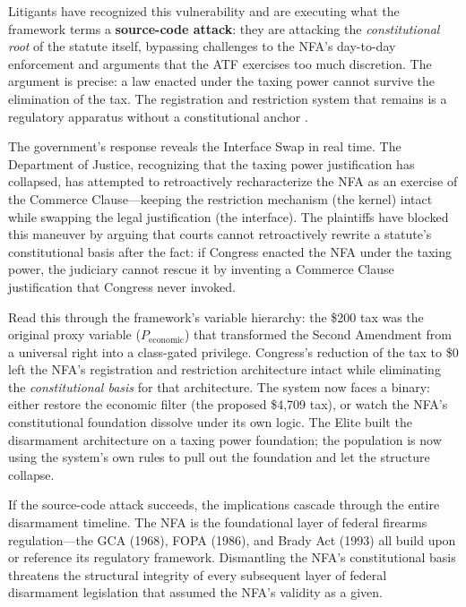 Litigants have recognized this vulnerability and are executing what the framework terms a \textbf{source-code attack}: they are attacking the \textit{constitutional root} of the statute itself, bypassing challenges to the NFA's day-to-day enforcement and arguments that the ATF exercises too much discretion. The argument is precise: a law enacted under the taxing power cannot survive the elimination of the tax. The registration and restriction system that remains is a regulatory apparatus without a constitutional anchor \cite{nfataxzero}.

The government's response reveals the Interface Swap in real time. The Department of Justice, recognizing that the taxing power justification has collapsed, has attempted to retroactively recharacterize the NFA as an exercise of the Commerce Clause---keeping the restriction mechanism (the kernel) intact while swapping the legal justification (the interface). The plaintiffs have blocked this maneuver by arguing that courts cannot retroactively rewrite a statute's constitutional basis after the fact: if Congress enacted the NFA under the taxing power, the judiciary cannot rescue it by inventing a Commerce Clause justification that Congress never invoked.

Read this through the framework's variable hierarchy: the \$200 tax was the original proxy variable ($P_{\text{economic}}$) that transformed the Second Amendment from a universal right into a class-gated privilege. Congress's reduction of the tax to \$0 left the NFA's registration and restriction architecture intact while eliminating the \textit{constitutional basis} for that architecture. The system now faces a binary: either restore the economic filter (the proposed \$4,709 tax), or watch the NFA's constitutional foundation dissolve under its own logic. The Elite built the disarmament architecture on a taxing power foundation; the population is now using the system's own rules to pull out the foundation and let the structure collapse.

If the source-code attack succeeds, the implications cascade through the entire disarmament timeline. The NFA is the foundational layer of federal firearms regulation---the GCA (1968), FOPA (1986), and Brady Act (1993) all build upon or reference its regulatory framework. Dismantling the NFA's constitutional basis threatens the structural integrity of every subsequent layer of federal disarmament legislation that assumed the NFA's validity as a given.

\FloatBarrier

